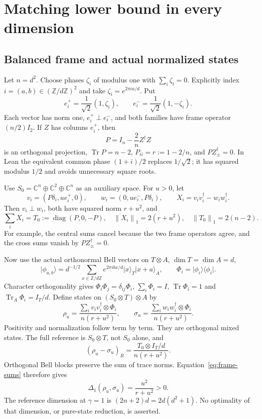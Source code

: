 \documentclass[11pt,a4paper]{article}
\newcommand{\Tr}{\operatorname{Tr}}
\newcommand{\norm}[1]{\left\lVert#1\right\rVert}
\newcommand{\ket}[1]{\lvert#1\rangle}
\newcommand{\bra}[1]{\langle#1\rvert}
\begin{document}
\section{Matching lower bound in every dimension}
\subsection{Balanced frame and actual normalized states}
Let $n=d^2$. Choose phases $\zeta_i$ of modulus one with $\sum_i\zeta_i=0$. Explicitly index $i=(a,b)\in(\mathbb Z/d\mathbb Z)^2$ and take $\zeta_i=e^{2\pi ia/d}$. Put
\[
 e_i^+=\frac1{\sqrt2}(1,\zeta_i),\qquad
 e_i^-=\frac1{\sqrt2}(1,-\zeta_i).
\]
Each vector has norm one, $e_i^+\perp e_i^-$, and both families have frame operator $(n/2)I_2$. If $Z$ has columns $e_i^+$, then
\[
 P=I_n-\frac2nZ^\dagger Z
\]
is an orthogonal projection, $\Tr P=n-2$, $P_{ii}=r:=1-2/n$, and $PZ_\pm^\dagger=0$. In Lean the equivalent common phase $(1+i)/2$ replaces $1/\sqrt2$; it has squared modulus $1/2$ and avoids unnecessary square roots.

Use $S_0=\mathbb C^n\oplus\mathbb C^2\oplus\mathbb C^n$ as an auxiliary space. For $u>0$, let
\[
 v_i=(P\delta_i,u e_i^+,0),\qquad
 w_i=(0,u e_i^-,P\delta_i),\qquad
 X_i=v_iv_i^\dagger-w_iw_i^\dagger.
\]
Then $v_i\perp w_i$, both have squared norm $r+u^2$, and
\begin{equation}\label{eq:frame-sums}
 \sum_iX_i=T_0:=\operatorname{diag}(P,0,-P),\quad
 \norm{X_i}_1=2(r+u^2),\quad \norm{T_0}_1=2(n-2).
\end{equation}
For example, the central sums cancel because the two frame operators agree, and the cross sums vanish by $PZ_\pm^\dagger=0$.

Now use the actual orthonormal Bell vectors on $T\otimes A$, $\dim T=\dim A=d$,
\[
 \ket{\phi_{a,b}}=d^{-1/2}\sum_{x\in\mathbb Z/d\mathbb Z}
 e^{2\pi ibx/d}\ket{x}_T\ket{x+a}_A,
 \qquad\Phi_i=\ket{\phi_i}\bra{\phi_i}.
\]
Character orthogonality gives $\Phi_i\Phi_j=\delta_{ij}\Phi_i$, $\sum_i\Phi_i=I$, $\Tr\Phi_i=1$ and $\Tr_A\Phi_i=I_T/d$. Define states on $(S_0\otimes T)\otimes A$ by
\begin{equation}\label{eq:states}
 \rho_u=\frac{\sum_i v_iv_i^\dagger\otimes\Phi_i}{n(r+u^2)},\qquad
 \sigma_u=\frac{\sum_i w_iw_i^\dagger\otimes\Phi_i}{n(r+u^2)}.
\end{equation}
Positivity and normalization follow term by term. They are orthogonal mixed states. The full reference is $S_0\otimes T$, not $S_0$ alone, and
\[
 (\rho_u-\sigma_u)_R=\frac{T_0\otimes I_T/d}{n(r+u^2)}.
\]
Orthogonal Bell blocks preserve the sum of trace norms. Equation~\eqref{eq:frame-sums} therefore gives
\begin{equation}\label{eq:positive-denom}
 \Delta_1(\rho_u,\sigma_u)=\frac{u^2}{r+u^2}>0.
\end{equation}
The reference dimension at $\gamma=1$ is $(2n+2)d=2d(d^2+1)$. No optimality of that dimension, or pure-state reduction, is asserted.
\end{document}
